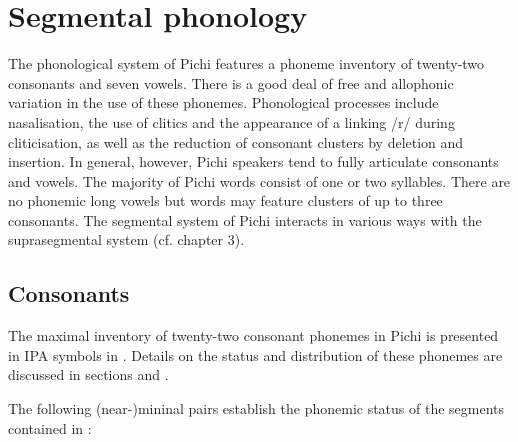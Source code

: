 \chapter{Segmental phonology}

The phonological system of Pichi features a phoneme inventory of twenty-two consonants and seven vowels. There is a good deal of free and allophonic variation in the use of these phonemes. Phonological processes include nasalisation, the use of clitics and the appearance of a linking /r/ during cliticisation, as well as the reduction of consonant clusters by deletion and insertion. In general, however, Pichi speakers tend to fully articulate consonants and vowels. The majority of Pichi words consist of one or two syllables. There are no phonemic long vowels but words may feature clusters of up to three consonants. The segmental system of Pichi interacts in various ways with the suprasegmental system (cf. chapter 3).

\section{Consonants}\label{sec:2.1}

The maximal inventory of twenty-two consonant phonemes in Pichi is presented in IPA symbols in . Details on the status and distribution of these phonemes are discussed in sections  and .

\begin{table}
\caption{Consonant and approximant phonemes}
\label{tab:key:2.1}
\end{table}
The following (near-)mininal pairs establish the phonemic status of the segments contained in :

